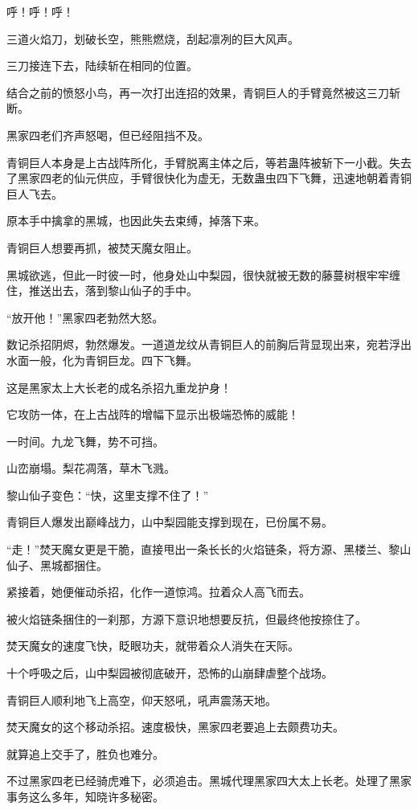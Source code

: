 \begin{this_body}
呼！呼！呼！

三道火焰刀，划破长空，熊熊燃烧，刮起凛冽的巨大风声。

三刀接连下去，陆续斩在相同的位置。

结合之前的愤怒小鸟，再一次打出连招的效果，青铜巨人的手臂竟然被这三刀斩断。

黑家四老们齐声怒喝，但已经阻挡不及。

青铜巨人本身是上古战阵所化，手臂脱离主体之后，等若蛊阵被斩下一小截。失去了黑家四老的仙元供应，手臂很快化为虚无，无数蛊虫四下飞舞，迅速地朝着青铜巨人飞去。

原本手中擒拿的黑城，也因此失去束缚，掉落下来。

青铜巨人想要再抓，被焚天魔女阻止。

黑城欲逃，但此一时彼一时，他身处山中梨园，很快就被无数的藤蔓树根牢牢缠住，推送出去，落到黎山仙子的手中。

“放开他！”黑家四老勃然大怒。

数记杀招阴烬，勃然爆发。一道道龙纹从青铜巨人的前胸后背显现出来，宛若浮出水面一般，化为青铜巨龙。四下飞舞。

这是黑家太上大长老的成名杀招九重龙护身！

它攻防一体，在上古战阵的增幅下显示出极端恐怖的威能！

一时间。九龙飞舞，势不可挡。

山峦崩塌。梨花凋落，草木飞溅。

黎山仙子变色：“快，这里支撑不住了！”

青铜巨人爆发出巅峰战力，山中梨园能支撑到现在，已份属不易。

“走！”焚天魔女更是干脆，直接甩出一条长长的火焰链条，将方源、黑楼兰、黎山仙子、黑城都捆住。

紧接着，她便催动杀招，化作一道惊鸿。拉着众人高飞而去。

被火焰链条捆住的一刹那，方源下意识地想要反抗，但最终他按捺住了。

焚天魔女的速度飞快，眨眼功夫，就带着众人消失在天际。

十个呼吸之后，山中梨园被彻底破开，恐怖的山崩肆虐整个战场。

青铜巨人顺利地飞上高空，仰天怒吼，吼声震荡天地。

焚天魔女的这个移动杀招。速度极快，黑家四老要追上去颇费功夫。

就算追上交手了，胜负也难分。

不过黑家四老已经骑虎难下，必须追击。黑城代理黑家四大太上长老。处理了黑家事务这么多年，知晓许多秘密。


\end{this_body}
